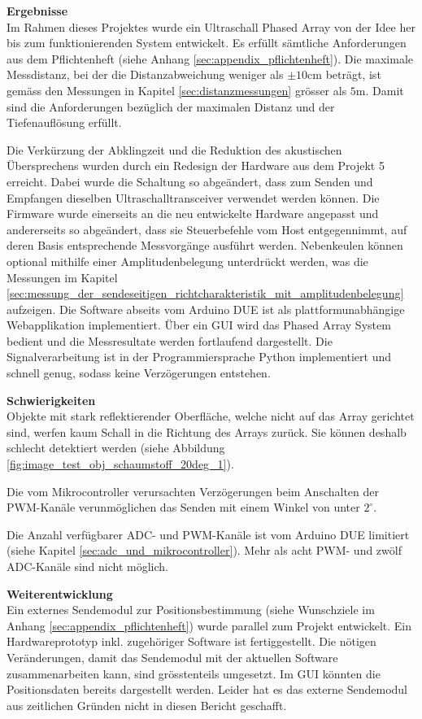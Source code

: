 \textbf{Ergebnisse}\\
Im Rahmen dieses Projektes wurde ein Ultraschall Phased Array von der Idee her bis zum funktionierenden System entwickelt. Es erfüllt sämtliche Anforderungen aus dem Pflichtenheft (siehe Anhang \ref{sec:appendix_pflichtenheft}). Die maximale Messdistanz, bei der die Distanzabweichung weniger als $\pm 10 \mathrm{cm}$ beträgt, ist gemäss den Messungen in Kapitel \ref{sec:distanzmessungen} grösser als $5 \mathrm{m}$. Damit sind die Anforderungen bezüglich der maximalen Distanz und der Tiefenauflösung erfüllt.

Die Verkürzung der Abklingzeit und die Reduktion des akustischen Übersprechens wurden durch ein Redesign der Hardware aus dem Projekt 5 erreicht. Dabei wurde die Schaltung so abgeändert, dass zum Senden und Empfangen dieselben Ultraschalltransceiver verwendet werden können. Die Firmware wurde einerseits an die neu entwickelte Hardware angepasst und andererseits so abgeändert, dass sie Steuerbefehle vom Host entgegennimmt, auf deren Basis entsprechende Messvorgänge ausführt werden. Nebenkeulen können optional mithilfe einer Amplitudenbelegung unterdrückt werden, was die Messungen im Kapitel \ref{sec:messung_der_sendeseitigen_richtcharakteristik_mit_amplitudenbelegung} aufzeigen.
Die Software abseits vom Arduino DUE ist als plattformunabhängige Webapplikation implementiert. Über ein GUI wird das Phased Array System bedient und die Messresultate werden fortlaufend dargestellt. Die Signalverarbeitung ist in der Programmiersprache Python implementiert und schnell genug, sodass keine Verzögerungen entstehen.

\textbf{Schwierigkeiten}\\
Objekte mit stark reflektierender Oberfläche, welche nicht auf das Array gerichtet sind, werfen kaum Schall in die Richtung des Arrays zurück. Sie können deshalb schlecht detektiert werden (siehe Abbildung \ref{fig:image_test_obj_schaumstoff_20deg_1}).

Die vom Mikrocontroller verursachten Verzögerungen beim Anschalten der PWM-Kanäle verunmöglichen das Senden mit einem Winkel von unter $2^{\circ}$.

Die Anzahl verfügbarer ADC- und PWM-Kanäle ist vom Arduino DUE limitiert (siehe Kapitel \ref{sec:adc_und_mikrocontroller}). Mehr als acht PWM- und zwölf ADC-Kanäle sind nicht möglich.

\textbf{Weiterentwicklung}\\
Ein externes Sendemodul zur Positionsbestimmung (siehe Wunschziele im Anhang \ref{sec:appendix_pflichtenheft}) wurde pa\-rallel zum Projekt entwickelt. Ein Hardwareprototyp inkl. zugehöriger Software ist fertiggestellt. Die nötigen Veränderungen, damit das Sendemodul mit der aktuellen Software zusammenarbeiten kann, sind grösstenteils umgesetzt. Im GUI könnten die Positionsdaten bereits dargestellt werden. Leider hat es das externe Sendemodul aus zeitlichen Gründen nicht in diesen Bericht geschafft.

